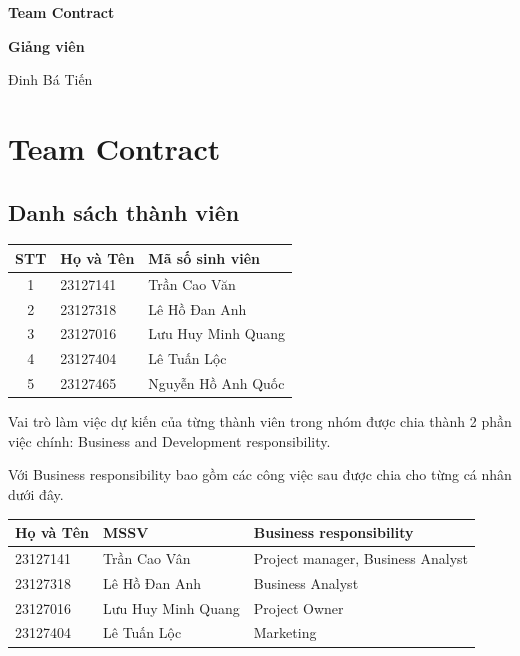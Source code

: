 \documentclass[12pt,a4paper]{article}
\newcommand{\instructor}{Đinh Bá Tiến}
\begin{document}
\begin{titlepage}
  \vspace{0.6cm}
  {\Large\bfseries Team Contract}\par
  \vspace{1.6cm}

  {\Large\bfseries Giảng viên}\par
  \vspace{0.2cm}
  {\Large \instructor\par}

\end{titlepage}

\newpage
{}
\newpage

\section{Team Contract}
\subsection{Danh sách thành viên}


\vspace{0.25cm}
\def\arraystretch{2.5} %
\setlength{\tabcolsep}{12pt} %
\begin{tabular}{c l l}
\toprule
\textbf{STT} & \textbf{Họ và Tên} & \textbf{Mã số sinh viên} \\
\midrule
1 & 23127141 & Trần Cao Văn \\
2 & 23127318 & Lê Hồ Đan Anh \\
3 & 23127016 & Lưu Huy Minh Quang \\
4 & 23127404 & Lê Tuấn Lộc \\
5 & 23127465 & Nguyễn Hồ Anh Quốc \\
\bottomrule
\end{tabular}
\vspace{0.5cm}

Vai trò làm việc dự kiến của từng thành viên trong nhóm được chia thành 2 phần việc chính: Business and Development responsibility.

Với Business responsibility bao gồm các công việc sau được chia cho từng cá nhân dưới đây.

\vspace{0.25cm}
\begin{tabular}{l l l}
\toprule
\textbf{Họ và Tên} & \textbf{MSSV} & \textbf{Business responsibility} \\
\midrule
23127141 & Trần Cao Vân & Project manager, Business Analyst \\
23127318 & Lê Hồ Đan Anh & Business Analyst \\
23127016 & Lưu Huy Minh Quang & Project Owner \\
23127404 & Lê Tuấn Lộc & Marketing \\
\bottomrule
\end{tabular}
\vspace{0.5cm}
\end{document}
